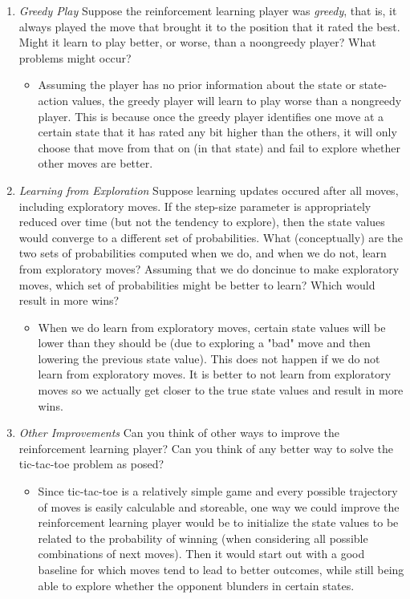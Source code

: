 \documentclass{article}
\begin{document}
\begin{enumerate}
    \item \emph{Greedy Play} Suppose the reinforcement learning player was \emph{greedy}, that is, it always played the move that brought it to the position that it rated the best. Might it learn to play better, or worse, than a noongreedy player? What problems might occur?
    \begin{itemize}
        \item Assuming the player has no prior information about the state or state-action values, the greedy player will learn to play worse than a nongreedy player. This is because once the greedy player identifies one move at a certain state that it has rated any bit higher than the others, it will only choose that move from that on (in that state) and fail to explore whether other moves are better.
    \end{itemize}

    \item \emph{Learning from Exploration} Suppose learning updates occured after all moves, including exploratory moves. If the step-size parameter is appropriately reduced over time (but not the tendency to explore), then the state values would converge to a different set of probabilities. What (conceptually) are the two sets of probabilities computed when we do, and when we do not, learn from exploratory moves? Assuming that we do doncinue to make exploratory moves, which set of probabilities might be better to learn? Which would result in more wins?
    \begin{itemize}
        \item When we do learn from exploratory moves, certain state values will be lower than they should be (due to exploring a "bad" move and then lowering the previous state value). This does not happen if we do not learn from exploratory moves. It is better to not learn from exploratory moves so we actually get closer to the true state values and result in more wins.
    \end{itemize}
    \item \emph{Other Improvements} Can you think of other ways to improve the reinforcement learning player? Can you think of any better way to solve the tic-tac-toe problem as posed?
    \begin{itemize}
        \item Since tic-tac-toe is a relatively simple game and every possible trajectory of moves is easily calculable and storeable, one way we could improve the reinforcement learning player would be to initialize the state values to be related to the probability of winning (when considering all possible combinations of next moves). Then it would start out with a good baseline for which moves tend to lead to better outcomes, while still being able to explore whether the opponent blunders in certain states.
    \end{itemize}
\end{enumerate}
\end{document}
